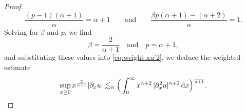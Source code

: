 \documentclass[reqno,12pt]{amsart}
\renewcommand{\d}{\ensuremath{\mathrm{d}}}
\renewcommand{\d}{\ensuremath{{\rm d}}}
\numberwithin{equation}{section}
\begin{document}
\begin{proof}
\begin{equation*}
\frac{(p-1)(\alpha +1)}{\alpha} = \alpha +1 \qquad \text{and} \qquad 
\frac{\beta p(\alpha +1) -(\alpha+2)}{\alpha} = 1. 
\end{equation*}
%
Solving for $\beta$ and $p$, we find  
%
\begin{equation*}
    \beta = \frac{2}{\alpha + 1} \quad \text{and} \quad p = \alpha + 1,
\end{equation*}
%
and substituting these values into \eqref{eq:weight xu'2}, we deduce the weighted estimate
\begin{equation}\label{eq:weight xu'3}
\sup_{x \ge 0} x^{\frac{2}{\alpha + 1}} |\partial_x u| \lesssim_{\alpha} \Big(\int_0^\infty  x^{\alpha+2} \, |\partial_x^2 u|^{\alpha+1} \, \d x\Big)^{\frac{1}{\alpha +1}}. 
\end{equation}
%

%
\bigskip
%


\end{proof}
\end{document}
